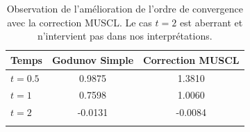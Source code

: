 \documentclass[
	french,
	11pt, %
]{fphw}
\newcommand{\tabhead}[1]{{\bfseries#1}}
\begin{document}
\begin{table}[h!]
    \centering
    \begin{tabular}{l c c}
        \toprule
        \tabhead{Temps} & \tabhead{Godunov Simple} & \tabhead{Correction MUSCL} \\
        \midrule
        \tabhead{$t=0.5$} & 0.9875 & 1.3810 \\
        \tabhead{$t=1$} & 0.7598 & 1.0060 \\
        \tabhead{$t=2$} & -0.0131 & -0.0084 \\
        \bottomrule\\
    \end{tabular}
	\caption{Observation de l'amélioration de l'ordre de convergence avec la correction MUSCL. Le cas $t=2$ est aberrant et n'intervient pas dans nos interprétations.}
	\label{tab:burger}
\end{table}
\end{document}
